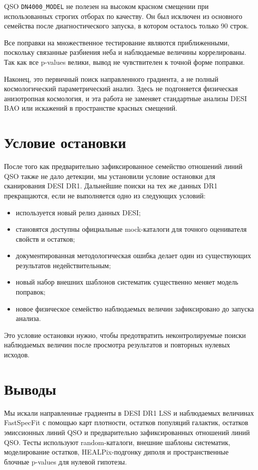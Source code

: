 \documentclass[11pt]{article}
\begin{document}
QSO \texttt{DN4000\_MODEL} не полезен на высоком красном смещении при использованных строгих отборах по качеству. Он был исключен из основного семейства после диагностического запуска, в котором осталось только 90 строк.

Все поправки на множественное тестирование являются приближенными, поскольку связанные разбиения неба и наблюдаемые величины коррелированы. Так как все p-values велики, вывод не чувствителен к точной форме поправки.

Наконец, это первичный поиск направленного градиента, а не полный космологический параметрический анализ. Здесь не подгоняется физическая анизотропная космология, и эта работа не заменяет стандартные анализы DESI BAO или искажений в пространстве красных смещений.

\section{Условие остановки}

После того как предварительно зафиксированное семейство отношений линий QSO также не дало детекции, мы установили условие остановки для сканирования DESI DR1. Дальнейшие поиски на тех же данных DR1 прекращаются, если не выполняется одно из следующих условий:
\begin{itemize}
    \item используется новый релиз данных DESI;
    \item становятся доступны официальные mock-каталоги для точного оценивателя свойств и остатков;
    \item документированная методологическая ошибка делает один из существующих результатов недействительным;
    \item новый набор внешних шаблонов систематик существенно меняет модель поправок;
    \item новое физическое семейство наблюдаемых величин зафиксировано до запуска анализа.
\end{itemize}

Это условие остановки нужно, чтобы предотвратить неконтролируемые поиски наблюдаемых величин после просмотра результатов и повторных нулевых исходов.

\section{Выводы}

Мы искали направленные градиенты в DESI DR1 LSS и наблюдаемых величинах FastSpecFit с помощью карт плотности, остатков популяций галактик, остатков эмиссионных линий QSO и предварительно зафиксированных отношений линий QSO. Тесты используют random-каталоги, внешние шаблоны систематик, моделирование остатков, HEALPix-подгонку диполя и пространственные блочные p-values для нулевой гипотезы.
\end{document}
